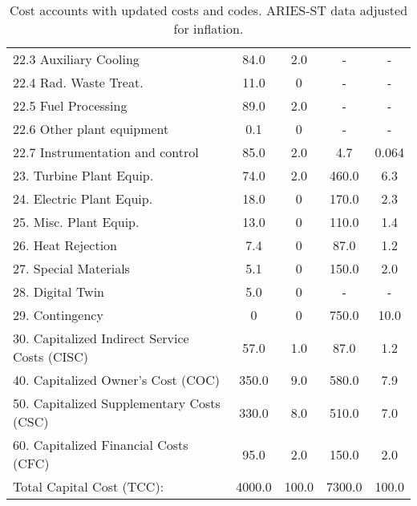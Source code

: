 \begin{table}[h!]
{\begin{tabular}{lcccc}
\hspace{10mm}22.3 Auxiliary Cooling & 84.0 & 2.0 & - & - \\
\hspace{10mm}22.4 Rad. Waste Treat. & 11.0 & 0 & - & - \\
\hspace{10mm}22.5 Fuel Processing & 89.0 & 2.0 & - & - \\
\hspace{10mm}22.6 Other plant equipment & 0.1 & 0 & - & - \\
\hspace{10mm}22.7 Instrumentation and control & 85.0 & 2.0 & 4.7 & 0.064 \\
\hspace{5mm}23. Turbine Plant Equip. & 74.0 & 2.0 & 460.0 & 6.3 \\
\hspace{5mm}24. Electric Plant Equip. & 18.0 & 0 & 170.0 & 2.3 \\
\hspace{5mm}25. Misc. Plant Equip. & 13.0 & 0 & 110.0 & 1.4 \\
\hspace{5mm}26. Heat Rejection & 7.4 & 0 & 87.0 & 1.2 \\
\hspace{5mm}27. Special Materials & 5.1 & 0 & 150.0 & 2.0 \\
\hspace{5mm}28. Digital Twin & 5.0 & 0 & - & - \\
\hspace{5mm}29. Contingency & 0 & 0 & 750.0 & 10.0 \\
30. Capitalized Indirect Service Costs (CISC) & 57.0 & 1.0 & 87.0 & 1.2 \\
40. Capitalized Owner’s Cost (COC) & 350.0 & 9.0 & 580.0 & 7.9 \\
50. Capitalized Supplementary Costs (CSC) & 330.0 & 8.0 & 510.0 & 7.0 \\
60. Capitalized Financial Costs (CFC) & 95.0 & 2.0 & 150.0 & 2.0 \\
\hline
Total Capital Cost (TCC): & 4000.0 & 100.0 & 7300.0 & 100.0 \\
\hline
\end{tabular}
}
\caption{Cost accounts with updated costs and codes. ARIES-ST data adjusted for inflation.}
\label{tab:costs_updated_codes}
\end{table}



